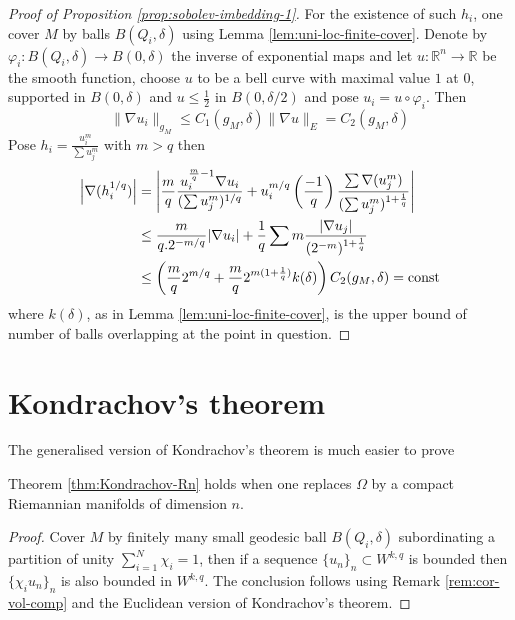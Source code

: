 \documentclass[11pt]{article}
\begin{document}
\begin{proof}[Proof of Proposition \ref{prop:sobolev-imbedding-1}]
For the existence of such \(h_i\), one cover \(M\) by balls \(B(Q_i,\delta)\) using
Lemma \ref{lem:uni-loc-finite-cover}. Denote by \(\varphi_i:B(Q_i,\delta) \longrightarrow
B(0,\delta)\) the inverse of exponential maps and let \(u:  \mathbb{R}^n \longrightarrow
\mathbb{R}\) be the smooth function, choose \(u\) to be a bell curve with maximal value
\(1\) at \(0\), supported in \(B(0,\delta)\) and \(u\leq \frac{1}{2}\) in \(B(0,\delta/2)\) and pose \(u_i = u\circ \varphi_i\). Then 
\[
 \|\nabla u_i\|_{g_M} \leq C_1(g_M,\delta) \|\nabla u\|_E = C_2(g_M,\delta)
\]
Pose \(h_i = \frac{u_i^m}{\sum u_j^m}\) with \(m>q\) then
\begin{equation*}
\begin{split}
\left|\nabla(h_i^{1/q})\right| &= \left|\frac{m}{q}\frac{u_i^{\frac{m}{q} - 1}\nabla u_i}{(\sum u_j^m)^{1/q}} + u_i^{m/q}\left(\frac{-1}{q}\right)\frac{\sum\nabla (u_j^m)}{(\sum u_j^m)^{1+ \frac{1}{q}}}\right|\\
		  &\leq \frac{m}{q.2^{-m/q}}|\nabla u_i| + \frac{1}{q}\sum m \frac{|\nabla u_j|}{(2^{-m})^{1+\frac{1}{q}}}\\
		  &\leq \left( \frac{m}{q}2^{m/q} + \frac{m}{q}2^{m(1+\frac{1}{q})}k(\delta)\right)C_2(g_M,\delta)=\mathop{\rm const }\nolimits
\end{split}   
\end{equation*}
where \(k(\delta)\), as in Lemma \ref{lem:uni-loc-finite-cover}, is the upper bound of
number of balls overlapping at the point in question.
\end{proof}






\section{Kondrachov's theorem}
\label{sec:orgb2a0b0a}
The generalised version of Kondrachov's theorem is much easier to prove
\begin{theorem}[Kondrachov]
\label{thm:kondrachov}
Theorem \ref{thm:Kondrachov-Rn} holds when one replaces \(\Omega\) by a compact Riemannian
manifolds of dimension \(n\).
\end{theorem}
\begin{proof}
Cover \(M\) by finitely many small geodesic ball \(B(Q_i,\delta)\) subordinating a partition of unity \(\sum_{i=1}^N \chi_i = 1\), then if a sequence \(\{u_n\}_n \subset W^{k,q}\) is bounded then \(\{\chi_i u_n\}_n\) is also bounded in \(W^{k,q}\). The conclusion follows using Remark \ref{rem:cor-vol-comp} and the
Euclidean version of Kondrachov's theorem.
\end{proof}
\end{document}
